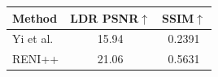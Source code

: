 \begin{tabular}{l|cc}
\hline
Method & LDR PSNR$\uparrow$ & SSIM$\uparrow$ \\
\hline
Yi et al. & 15.94 & 0.2391 \\
RENI++ & 21.06 & 0.5631 \\
\hline
\end{tabular}